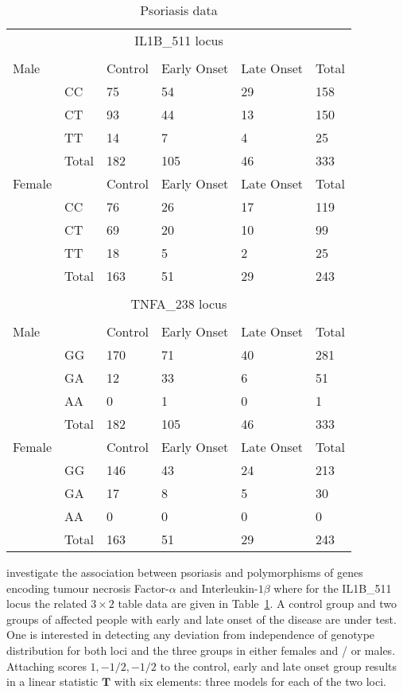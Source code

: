 \documentclass[bimj,fleqn]{w-art}
\newcommand{\T}{\mathbf{T}}
\begin{document}
\begin{table}
\begin{center}
\caption{Psoriasis data \label{reich}}
\vspace*{0.5cm}
\begin{tabular}{llllll} \\
\multicolumn{6}{c}{IL1B\_511 locus} \\
\multicolumn{6}{c}{} \\ 
Male  &  &  Control & Early Onset & Late Onset & Total \\ \hline 
 & CC  &  75 & 54 & 29 & 158  \\ 
 & CT  &  93 & 44 & 13 & 150  \\ 
 & TT  &  14 & 7 & 4 & 25  \\ 
 & Total  &  182 & 105 & 46 & 333  \\ 
Female  &  &  Control & Early Onset & Late Onset & Total \\ \hline 
 & CC  &  76 & 26 & 17 & 119  \\ 
 & CT  &  69 & 20 & 10 & 99  \\ 
 & TT  &  18 & 5 & 2 & 25  \\ 
 & Total  &  163 & 51 & 29 & 243  \\ \multicolumn{6}{c}{} \\
\multicolumn{6}{c}{TNFA\_238 locus} \\
\multicolumn{6}{c}{} \\
Male  &  &  Control & Early Onset & Late Onset & Total \\ \hline 
 & GG  &  170 & 71 & 40 & 281  \\ 
 & GA  &  12 & 33 & 6 & 51  \\ 
 & AA  &  0 & 1 & 0 & 1  \\ 
 & Total  &  182 & 105 & 46 & 333  \\ 
Female  &  &  Control & Early Onset & Late Onset & Total \\ \hline 
 & GG  &  146 & 43 & 24 & 213  \\ 
 & GA  &  17 & 8 & 5 & 30  \\ 
 & AA  &  0 & 0 & 0 & 0  \\ 
 & Total  &  163 & 51 & 29 & 243  \\ \hline
\end{tabular}
\end{center}
\end{table}


\citet{Reich:2002} investigate the association between psoriasis and 
polymorphisms of genes encoding tumour necrosis Factor-$\alpha$ and 
Interleukin-$1\beta$ where for the IL1B\_511 locus the related 
$3 \times 2$ table data are given in Table~\ref{reich}.
A control group and two groups of affected people with early and
late onset of the disease are under test. One is
interested in detecting any deviation from independence of
genotype distribution for both loci and the three groups in either
females and / or males. Attaching scores $1, -1/2, -1/2$ to the
control, early and late onset group results in a linear statistic
$\T$ with six elements: three models for each of the two loci.
\end{document}
